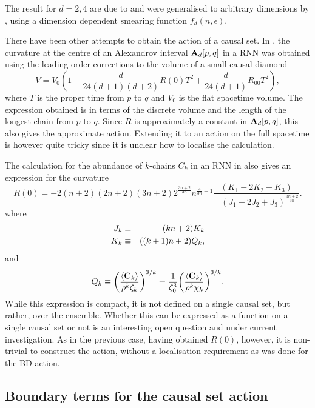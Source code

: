 The  result  for $d=2,4$  are due to   \cite{bd,dionthesis} and  were generalised to arbitrary dimensions by \cite{dg,glaser},
using   a dimension dependent smearing function $f_d(n,\epsilon)$.  
 
There have been other attempts to obtain the action of a causal set. In \cite{bomsver}, the curvature at the centre of an
Alexandrov interval $\mathbf A_d[p,q]$ in a RNN was obtained using the leading order corrections to the volume of a small
causal diamond \citep{gs} 
\begin{equation} 
V=V_0\left(1-\frac{d}{24(d+1)(d+2)} R(0) T^2 + \frac{d}{24(d+1)} R_{00}T^2\right), 
\end{equation} 
where $T$ is the proper time from $p$ to $q$ and $V_0$ is the flat spacetime volume. 
The expression obtained is in terms of the discrete volume and the length of the longest chain from $p$ to $q$.  Since
$R$ is approximately a constant in $\mathbf A_d[p,q]$,  this also gives the
approximate action.  Extending it to an action on the full spacetime is however quite tricky since it is unclear
how to localise the calculation. 

The calculation for  the abundance of $k$-chains $C_k$ in an RNN  in \cite{rss} also gives an expression for the curvature   
\begin{equation} 
\label{R}
R(0)= 
-{2(n+2)(2n+2)(3n+2)} 2^{\frac{3n+2}{3n}} n^{\frac{4}{3n}-1} \frac{(K_1-2K_2+K_3)}{\,\,\,\,\,(J_1 - 2J_2 +
  J_3)^{\frac{3n+2}{3n}}}.
\end{equation} 
 where 
\begin{eqnarray} 
\label{moreidentitiestwo}
J_k &\equiv& (kn+2) K_k \nonumber \\ 
K_k &\equiv& ((k+1)n+2)Q_k, 
\end{eqnarray} and 
\begin{equation} 
Q_k  \equiv  \biggl(\frac{\langle {\mathbf C_k} \rangle}{\rho^k\zeta_k }\biggr)^{3/k}
=\frac{1}{\zeta_0^3}\biggl(\frac{\langle {\mathbf C_k} \rangle}{\rho^k\chi_k }\biggr)^{3/k}. 
\end{equation} 
While this expression is compact, it is not  defined on a single causal set, but rather, over the ensemble.  Whether this
can be expressed as a function on a single  causal set or not is an interesting open  question and under current
investigation. As in the previous case, having obtained $R(0)$, however, it is non-trivial to construct the action,
without a localisation requirement as was done for the BD action.  



\subsection{Boundary terms for the causal set action} 
\label{ssec:ghy}

